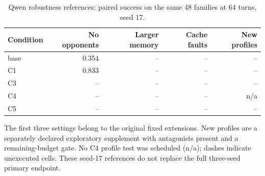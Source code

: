 \begin{table}[ht]\centering\small
\caption{Qwen robustness references: paired success on the same 48 families at 64 turns, seed 17.}
\begin{tabular}{lrrrr}\toprule
Condition & No opponents & Larger memory & Cache faults & New profiles\\\midrule
base & 0.354 & -- & -- & --\\
C1 & 0.833 & -- & -- & --\\
C3 & -- & -- & -- & --\\
C4 & -- & -- & -- & n/a\\
C5 & -- & -- & -- & --\\
\bottomrule\end{tabular}\end{table}
The first three settings belong to the original fixed extensions. New profiles are a separately declared exploratory supplement with antagonists present and a remaining-budget gate. No C4 profile test was scheduled (n/a); dashes indicate unexecuted cells. These seed-17 references do not replace the full three-seed primary endpoint.
